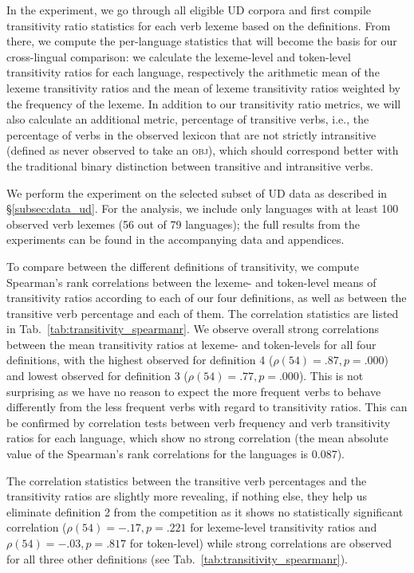 In the experiment, we go through all eligible UD corpora and first compile transitivity ratio statistics for each verb lexeme based on the definitions. From there, we compute the per-language statistics that will become the basis for our cross-lingual comparison: we calculate the lexeme-level and token-level transitivity ratios for each language, respectively the arithmetic mean of the lexeme transitivity ratios and the mean of lexeme transitivity ratios weighted by the frequency of the lexeme. In addition to our transitivity ratio metrics, we will also calculate an additional metric, percentage of transitive verbs, i.e., the percentage of verbs in the observed lexicon that are not strictly intransitive (defined as never observed to take an \textsc{obj}), which should correspond better with the traditional binary distinction between transitive and intransitive verbs.

We perform the experiment on the selected subset of UD data as described in §\ref{subsec:data_ud}. For the analysis, we include only languages with at least 100 observed verb lexemes (56 out of 79 languages); the full results from the experiments can be found in the accompanying data and appendices. 

To compare between the different definitions of transitivity, we compute Spearman's rank correlations between the lexeme- and token-level means of transitivity ratios according to each of our four definitions, as well as between the transitive verb percentage and each of them. The correlation statistics are listed in Tab.~\ref{tab:transitivity_spearmanr}. We observe overall strong correlations between the mean transitivity ratios at lexeme- and token-levels for all four definitions, with the highest observed for definition 4 ($\rho(54)=.87, p=.000$) and lowest observed for definition 3 ($\rho(54)=.77, p=.000$). This is not surprising as we have no reason to expect the more frequent verbs to behave differently from the less frequent verbs with regard to transitivity ratios. This can be confirmed by correlation tests between verb frequency and verb transitivity ratios for each language, which show no strong correlation (the mean absolute value of the Spearman's rank correlations for the languages is 0.087).



The correlation statistics between the transitive verb percentages and the transitivity ratios are slightly more revealing, if nothing else, they help us eliminate definition 2 from the competition as it shows no statistically significant correlation ($\rho(54)=-.17, p=.221$ for lexeme-level transitivity ratios and $\rho(54)=-.03, p=.817$ for token-level) while strong correlations are observed for all three other definitions (see Tab.~\ref{tab:transitivity_spearmanr}).

